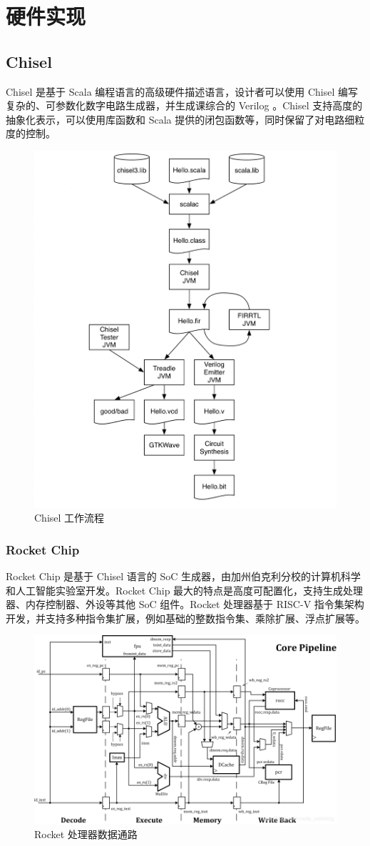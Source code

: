 
\chapter{硬件实现}

\section{Chisel}

Chisel \cite{chisel} 是基于 Scala 编程语言的高级硬件描述语言，设计者可以使用 Chisel 编写复杂的、可参数化数字电路生成器，并生成课综合的 Verilog 。Chisel 支持高度的抽象化表示，可以使用库函数和 Scala 提供的闭包函数等，同时保留了对电路细粒度的控制。

\begin{figure}
    \centering
    \includegraphics[width=0.5\linewidth]{figures/chisel-tool-flow.png}
    \caption{Chisel 工作流程\cite{chiselbook}}
    \label{fig:chisel}
\end{figure}

\subsection{Rocket Chip}

Rocket Chip 是基于 Chisel 语言的 SoC 生成器，由加州伯克利分校的计算机科学和人工智能实验室开发。Rocket Chip 最大的特点是高度可配置化，支持生成处理器、内存控制器、外设等其他 SoC 组件。Rocket 处理器基于 RISC-V 指令集架构开发，并支持多种指令集扩展，例如基础的整数指令集、乘除扩展、浮点扩展等。

\begin{figure}
    \centering
    \includegraphics[width=0.8\linewidth]{figures/rocketchip.png}
    \caption{Rocket 处理器数据通路}
    \label{fig:rocketchip}
\end{figure}

